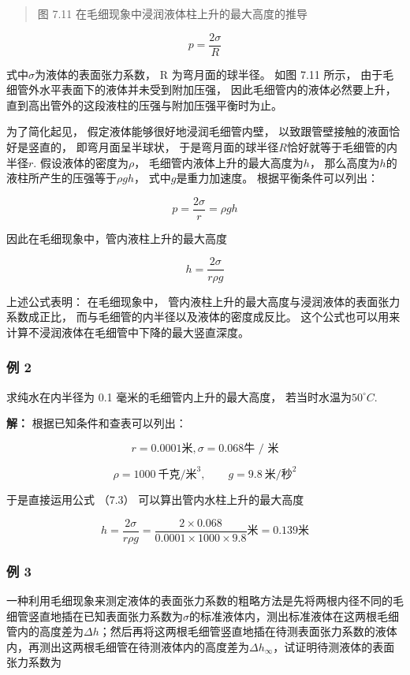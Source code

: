 \begin{quote}
图 7.11 在毛细现象中浸润液体柱上升的最大高度的推导
\end{quote}

\[
p = \frac {2 \sigma}{R} \tag {7.2}
\]

式中\(\sigma\)为液体的表面张力系数， R 为弯月面的球半径。 如图 7.11
所示， 由于毛细管外水平表面下的液体并未受到附加压强，
因此毛细管内的液体必然要上升，
直到高出管外的这段液柱的压强与附加压强平衡时为止。

为了简化起见， 假定液体能够很好地浸润毛细管内壁，
以致跟管壁接触的液面恰好是竖直的， 即弯月面呈半球状，
于是弯月面的球半径\(R\)恰好就等于毛细管的内半径\(r\).
假设液体的密度为\(\rho\)， 毛细管内液体上升的最大高度为\(h\)，
那么高度为\(h\)的液柱所产生的压强等于\(\rho gh\)，
式中\(g\)是重力加速度。 根据平衡条件可以列出：

\[
p = \frac {2 \sigma}{r} = \rho g h
\]

因此在毛细现象中，管内液柱上升的最大高度

\[
h = \frac {2 \sigma}{r \rho g} \tag {7.3}
\]

上述公式表明： 在毛细现象中，
管内液柱上升的最大高度与浸润液体的表面张力系数成正比，
而与毛细管的内半径以及液体的密度成反比。
这个公式也可以用来计算不浸润液体在毛细管中下降的最大竖直深度。

\subsubsection{例 2}\label{ux4f8b-2-7}

求纯水在内半径为 0.1 毫米的毛细管内上升的最大高度，
若当时水温为\(50^{\circ}C\).

\textbf{解：} 根据已知条件和查表可以列出：

\[
r = 0.0001 \text{米}, \sigma = 0.068 \text{牛 / 米}
\]

\[
\rho=1000\ \text{千克/米}^3,\qquad g=9.8\ \text{米/秒}^2
\]

于是直接运用公式 （7.3） 可以算出管内水柱上升的最大高度

\[
h = \frac {2 \sigma}{r \rho g} = \frac {2 \times 0.068}{0.0001 \times 1000 \times 9.8} \text{米} = 0.139 \text{米}
\]

\subsubsection{例 3}\label{ux4f8b-3-5}

一种利用毛细现象来测定液体的表面张力系数的粗略方法是先将两根内径不同的毛细管竖直地插在已知表面张力系数为\(\sigma\)的标准液体内，测出标准液体在这两根毛细管内的高度差为\(\Delta h\)；然后再将这两根毛细管竖直地插在待测表面张力系数的液体内，再测出这两根毛细管在待测液体内的高度差为\(\Delta h_{\infty}\)，试证明待测液体的表面张力系数为

